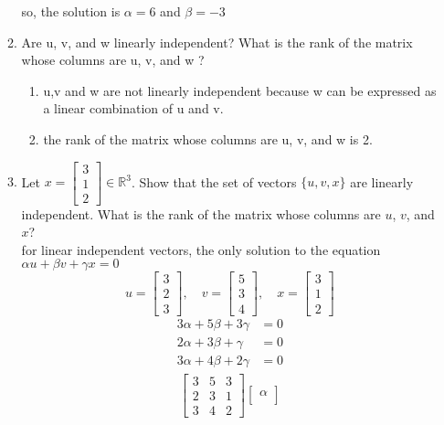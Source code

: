\documentclass[11pt]{article}
\begin{document}
\begin{enumerate}
\begin{enumerate}
\[\]
so, the solution is \( \alpha = 6 \) and \( \beta = -3 \)
\item Are u, v, and w linearly independent? What is the rank of the matrix whose columns are u, v, and w ?
\begin{enumerate}
    \item u,v and  w are not linearly independent because w can be expressed as a linear combination of u and v.
    \item the rank of the matrix whose columns are u, v, and w is 2.
\end{enumerate}
\item Let \( x = \begin{bmatrix} 3 \\ 1 \\ 2 \end{bmatrix} \in \mathbb{R}^3 \). Show that the set of vectors \(\{u, v, x\}\) are linearly independent. What is the rank of the matrix whose columns are \(u\), \(v\), and \(x\)?\\
for linear independent vectors, the only solution to the equation \( \alpha u + \beta v + \gamma x = 0 \) 
\[
    u = \begin{bmatrix}
        3 \\
        2 \\
        3
    \end{bmatrix}, \quad
    v = \begin{bmatrix}
        5 \\
        3 \\
        4
    \end{bmatrix}, \quad
    x = \begin{bmatrix}
        3 \\
        1 \\
        2
    \end{bmatrix}
\]
\[
\begin{aligned}
    3\alpha + 5\beta + 3\gamma &= 0 \\
    2\alpha + 3\beta + \gamma &= 0 \\
    3\alpha + 4\beta + 2\gamma &= 0
\end{aligned}
\]
\[
\begin{aligned}
    \begin{bmatrix}
        3 & 5 & 3 \\
        2 & 3 & 1 \\
        3 & 4 & 2
    \end{bmatrix}
    \begin{bmatrix}
        \alpha \\

\end{bmatrix}
\end{aligned}\]
\end{enumerate}
\end{enumerate}
\end{document}
